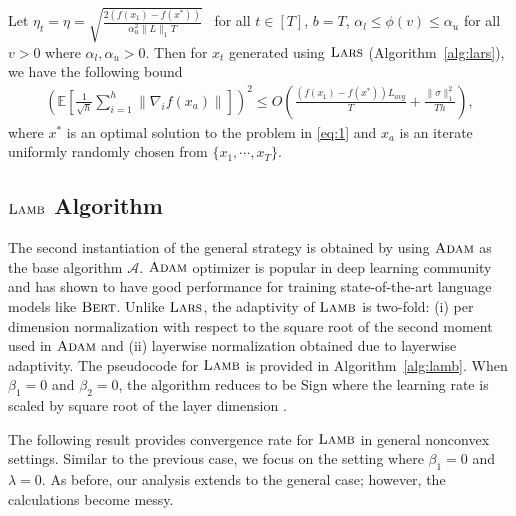 \begin{theorem}
\label{thm:lars-conv}
Let $\eta_t = \eta = \sqrt{\tfrac{2(f(x_1) - f(x^*))}{\alpha_u^2 \|L\|_1 T}}$ \ for all $t \in [T]$, $b=T$, $\alpha_l \leq \phi(v) \leq \alpha_u$ for all $v > 0$ where $\alpha_l, \alpha_u > 0$. Then for $x_t$ generated using $\textsc{Lars}$ (Algorithm~\ref{alg:lars}), we have the following bound
\begin{align*}
\left(\mathbb{E}\left[\frac{1}{\sqrt{h}}\sum_{i=1}^h \|\nabla_i f(x_a)\|\right]\right)^2 \leq O\left(\frac{(f(x_1) - f(x^*))L_{avg}}{T} + \frac{\|\sigma \|^2_1}{Th}\right), 
\end{align*}
where $x^*$ is an optimal solution to the problem in \eqref{eq:1} and $x_a$ is an iterate uniformly randomly chosen from $\{x_1, \cdots, x_T\}$.
\end{theorem}

\subsection{$\textsc{Lamb}$ Algorithm}
\label{Subsection:lamb}

The second instantiation of the general strategy is obtained by using $\textsc{Adam}$ as the base algorithm $\mathcal{A}$. $\textsc{Adam}$ optimizer is popular in deep learning community and has shown to have good performance for training state-of-the-art language models like $\textsc{Bert}$. Unlike $\textsc{Lars}$, the adaptivity of $\textsc{Lamb}$ is two-fold: (i) per dimension normalization with respect to the square root of the second moment used in $\textsc{Adam}$ and (ii) layerwise normalization  obtained due to layerwise adaptivity. The pseudocode for $\textsc{Lamb}$ is provided in Algorithm~\ref{alg:lamb}. When $\beta_1 = 0$ and $\beta_2 = 0$, the algorithm reduces to be Sign \sgd where the learning rate is scaled by square root of the layer dimension \citep{signsgd}.

The following result provides convergence rate for $\textsc{Lamb}$ in general nonconvex settings. Similar to the previous case, we focus on the setting where $\beta_1 = 0$ and $\lambda = 0$. As before, our analysis extends to the general case; however, the calculations become messy.

